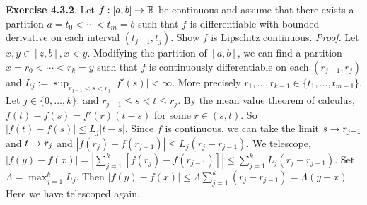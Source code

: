 {\bf Exercise 4.3.2}. Let $f: [a,b] \rightarrow \mathbb{R}$ be continuous and assume that there exists a partition $a = t_0<\cdots <t_m=b$ such that $f$ is differentiable with bounded derivative on each interval $(t_{j-1}, t_j)$. Show $f$ is Lipschitz continuous. {\it Proof}. Let $x,y \in [z,b], x < y$. Modifying the partition of $[a,b]$, we can find a partition $x=r_0<\cdots <r_k=y$ such that $f$ is continuously differentiable on each $(r_{j-1},r_j)$ and $L_j:=\sup_{r_{j-1}<s<r_j}|f'(s)|<\infty$. More precisely $r_1, \dots, r_{k-1} \in \{t_1,\dots,t_{m-1}\}$. Let $j \in \{0,\dots, k\}$. and $r_{j-1}\leq s<t\leq r_j$. By the mean value theorem of calculus, $f(t)-f(s)=f'(r)(t-s)$ for some $r \in (s,t)$. So $|f(t)-f(s)| \leq L_j|t-s|$. Since $f$ is continuous, we can take the limit $s \rightarrow r_{j-1}$ and $t \rightarrow r_j$ and $|f(r_j)-f(r_{j-1})|\leq L_j(r_j-r_{j-1})$. We telescope, $|f(y)-f(x)|=|\sum_{j=1}^k[f(r_j)-f(r_{j-1})]| \leq \sum_{j=1}^k L_j(r_j-r_{j-1})$. Set $\Lambda = \max_{j=1}^k L_j$. Then $|f(y)-f(x)| \leq \Lambda \sum_{j=1}^k (r_j-r_{j-1})=\Lambda (y-x)$. Here we have telescoped again. 